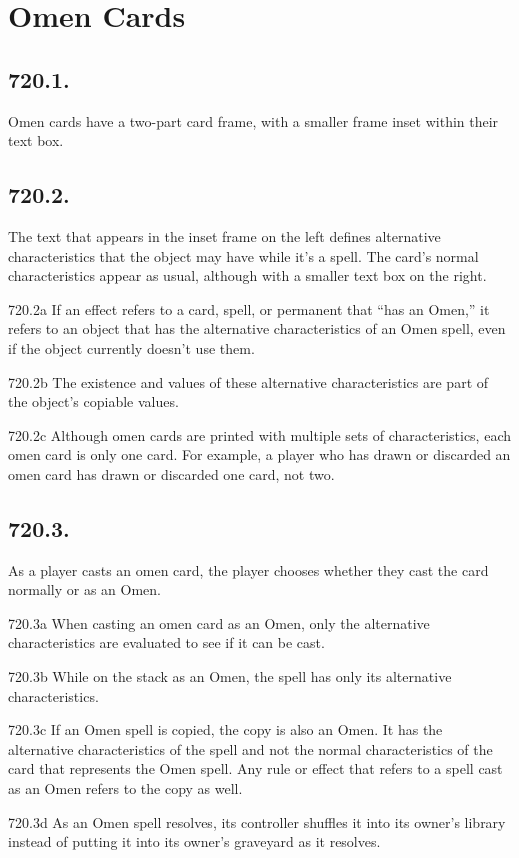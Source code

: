 \section{Omen Cards}
\subsection*{720.1.}
Omen cards have a two-part card frame, with a smaller frame inset within their text box.

\subsection*{720.2.}
The text that appears in the inset frame on the left defines alternative characteristics that the object may have while it’s a spell. The card’s normal characteristics appear as usual, although with a smaller text box on the right.

720.2a If an effect refers to a card, spell, or permanent that “has an Omen,” it refers to an object that has the alternative characteristics of an Omen spell, even if the object currently doesn’t use them.

720.2b The existence and values of these alternative characteristics are part of the object’s copiable values.

720.2c Although omen cards are printed with multiple sets of characteristics, each omen card is only one card. For example, a player who has drawn or discarded an omen card has drawn or discarded one card, not two.

\subsection*{720.3.}
As a player casts an omen card, the player chooses whether they cast the card normally or as an Omen.

720.3a When casting an omen card as an Omen, only the alternative characteristics are evaluated to see if it can be cast.

720.3b While on the stack as an Omen, the spell has only its alternative characteristics.

720.3c If an Omen spell is copied, the copy is also an Omen. It has the alternative characteristics of the spell and not the normal characteristics of the card that represents the Omen spell. Any rule or effect that refers to a spell cast as an Omen refers to the copy as well.

720.3d As an Omen spell resolves, its controller shuffles it into its owner’s library instead of putting it into its owner’s graveyard as it resolves.

